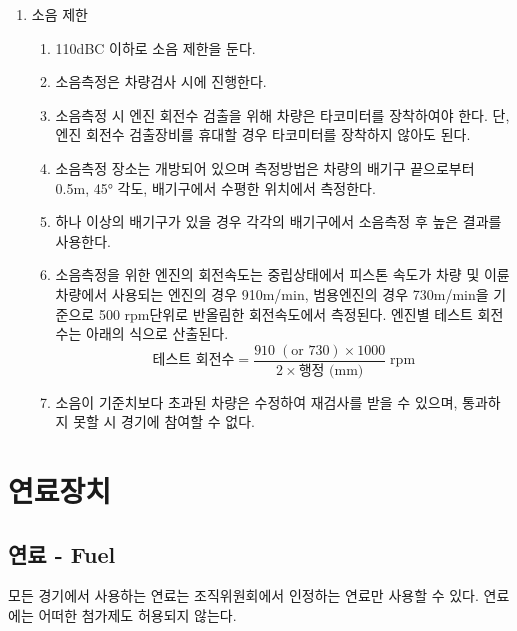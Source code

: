 \documentclass[final,a4paper,10pt]{report}
\begin{document}
\begin{enumerate}
  \item\label{rule:formula-technical.exhaust-system.noise-limit} 소음 제한
    \begin{enumerate}
      \item\label{rule:formula-technical.exhaust-system.noise-limit.max-110dbc} 110dBC 이하로 소음 제한을 둔다.
      \item\label{rule:formula-technical.exhaust-system.noise-limit.measured-at-tech-inspection} 소음측정은 차량검사 시에 진행한다.
      \item\label{rule:formula-technical.exhaust-system.noise-limit.tachometer-or-rpm-device} 소음측정 시 엔진 회전수 검출을 위해 차량은 타코미터를 장착하여야 한다. 단, 엔진 회전수 검출장비를 휴대할 경우 타코미터를 장착하지 않아도 된다.
      \item\label{rule:formula-technical.exhaust-system.noise-limit.measurement-distance-and-angle} 소음측정 장소는 개방되어 있으며 측정방법은 차량의 배기구 끝으로부터 0.5m, 45° 각도, 배기구에서 수평한 위치에서 측정한다.
      \item\label{rule:formula-technical.exhaust-system.noise-limit.multiple-outlets-highest-reading} 하나 이상의 배기구가 있을 경우 각각의 배기구에서 소음측정 후 높은 결과를 사용한다.
      \item\label{rule:formula-technical.exhaust-system.noise-limit.test-rpm-formula} 소음측정을 위한 엔진의 회전속도는 중립상태에서 피스톤 속도가 차량 및 이륜차량에서 사용되는 엔진의 경우 910m/min, 범용엔진의 경우 730m/min을 기준으로 500 rpm단위로 반올림한 회전속도에서 측정된다. 엔진별 테스트 회전수는 아래의 식으로 산출된다.
      \[
        \text{테스트 회전수}
        =
        \frac{910\;(\text{or }730)\times1000}{2\times\text{행정 (mm)}}
        \;\mathrm{rpm}
      \]
      \item\label{rule:formula-technical.exhaust-system.noise-limit.retest-and-exclusion} 소음이 기준치보다 초과된 차량은 수정하여 재검사를 받을 수 있으며, 통과하지 못할 시 경기에 참여할 수 없다.
    \end{enumerate}
\end{enumerate}

\chapter{연료장치}

\section{연료 - Fuel}\label{rule:formula-technical.fuel} \label{section:연료}
모든 경기에서 사용하는 연료는 조직위원회에서 인정하는 연료만 사용할 수 있다. 연료에는 어떠한 첨가제도 허용되지 않는다.
\end{document}
